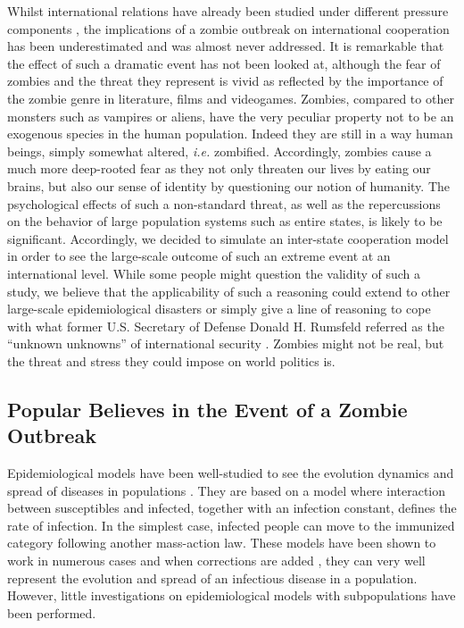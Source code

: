\documentclass[11pt]{article} %
\begin{document}
Whilst international relations have already been studied under different pressure components \cite{gourevitch1978second, abrahms2013credibility}, the implications of a zombie outbreak on international cooperation has been underestimated and was almost never addressed. It is remarkable that the effect of such a dramatic event has not been looked at, although the fear of zombies and the threat they represent is vivid as reflected by the importance of the zombie genre in literature, films and videogames. Zombies, compared to other monsters such as vampires or aliens, have the very peculiar property not to be an exogenous species in the human population. Indeed they are still in a way human beings, simply somewhat altered, \textit{i.e.} zombified. Accordingly, zombies cause a much more deep-rooted fear as they not only threaten our lives by eating our brains, but also our sense of identity by questioning our notion of humanity. The psychological effects of such a non-standard threat, as well as the repercussions on the behavior of large population systems such as entire states, is likely to be significant. Accordingly, we decided to simulate an inter-state cooperation model in order to see the large-scale outcome of such an extreme event at an international level. While some people might question the validity of such a study, we believe that the applicability of such a reasoning could extend to other large-scale epidemiological disasters or simply give a line of reasoning to cope with what former U.S. Secretary of Defense Donald H. Rumsfeld referred as the ``unknown unknowns'' of international security \cite{seely2009pieces}. Zombies might not be real, but the threat and stress they could impose on world politics is.



\subsection{Popular Believes in the Event of a Zombie Outbreak}\indent

Epidemiological models have been well-studied to see the evolution dynamics and spread of diseases in populations \cite{brauer2008compartmental, riley2003transmission, Kuperman2001qy}. They are based on a model where interaction between susceptibles and infected, together with an infection constant, defines the rate of infection. In the simplest case, infected people can move to the immunized category following another mass-action law. These models have been shown to work in numerous cases and when corrections are added \cite{m1925applications, stone2007seasonal}, they can very well represent the evolution and spread of an infectious disease in a population. However, little investigations on epidemiological models with subpopulations have been performed.
\end{document}
